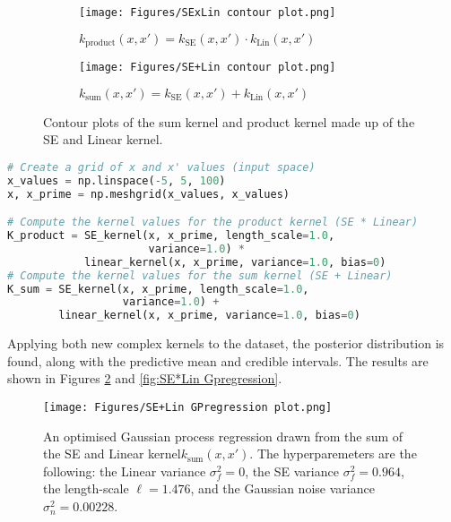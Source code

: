 \documentclass[12pt,a4paper]{article}
\begin{document}
\begin{figure}[h]
    \centering
    \begin{subfigure}[b]{0.45\textwidth}
        \centering
        \texttt{[image: Figures/SExLin contour plot.png]}
        \caption{\(k_{\text{product}}(x, x') =  k_{\text{SE}}(x, x') \cdot k_{\text{Lin}}(x, x')\)}
    \end{subfigure}%
    \begin{subfigure}[b]{0.45\textwidth}
        \centering
        \texttt{[image: Figures/SE+Lin contour plot.png]}
        \caption{\(k_{\text{sum}}(x, x') =  k_{\text{SE}}(x, x') + k_{\text{Lin}}(x, x')\)}
    \end{subfigure}
    \caption{Contour plots of the sum kernel and product kernel made up of the SE and Linear kernel.}
    \label{fig:SELin Contour plots}
\end{figure}
\vspace{20pt}
\begin{lstlisting}[language=python, caption={Code of creating a meshgrid and new complex kernels that can be mapped onto a contour plot.}, label={lst:SELin functions}]
# Create a grid of x and x' values (input space)
x_values = np.linspace(-5, 5, 100)
x, x_prime = np.meshgrid(x_values, x_values)

# Compute the kernel values for the product kernel (SE * Linear)
K_product = SE_kernel(x, x_prime, length_scale=1.0,
                      variance=1.0) * 
            linear_kernel(x, x_prime, variance=1.0, bias=0)
# Compute the kernel values for the sum kernel (SE + Linear)
K_sum = SE_kernel(x, x_prime, length_scale=1.0,
                  variance=1.0) + 
        linear_kernel(x, x_prime, variance=1.0, bias=0)
\end{lstlisting}

Applying both new complex kernels to the dataset, the posterior distribution is found, along with the predictive mean and credible intervals. The results are shown in Figures \ref{fig:SE+Lin Gpregression}  and \ref{fig:SE*Lin Gpregression}.

\begin{figure}[]
\centering
    \texttt{[image: Figures/SE+Lin GPregression plot.png]}
    \caption{An optimised Gaussian process regression drawn from the sum of the SE and Linear kernel\(k_{\text{sum}}(x, x')\). The hyperparemeters are the following: the Linear variance \(\sigma_f^2 = 0\), the SE variance \(\sigma_f^2 = 0.964\), the length-scale \(\ell = 1.476\), and the Gaussian noise variance \(\sigma_n^2 = 0.00228\).}
    \label{fig:SE+Lin Gpregression}
\end{figure}
\end{document}
